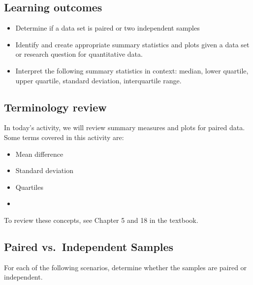 \documentclass[
]{report}
\begin{document}

\subsection{Learning outcomes}\label{learning-outcomes-23}

\begin{itemize}
\item
  Determine if a data set is paired or two independent samples
\item
  Identify and create appropriate summary statistics and plots
  given a data set or research question for quantitative data.
\item
  Interpret the following summary statistics in context:
  median, lower quartile, upper quartile,
  standard deviation, interquartile range.
\end{itemize}

\subsection{Terminology review}\label{terminology-review-18}

In today's activity, we will review summary measures and plots for paired data. Some terms covered in this activity are:

\begin{itemize}
\item
  Mean difference
\item
  Standard deviation
\item
  Quartiles
\item
\end{itemize}

To review these concepts, see Chapter 5 and 18 in the textbook.

\subsection{Paired vs.~Independent Samples}\label{paired-vs.-independent-samples-1}

For each of the following scenarios, determine whether the samples are paired or independent.
\end{document}
